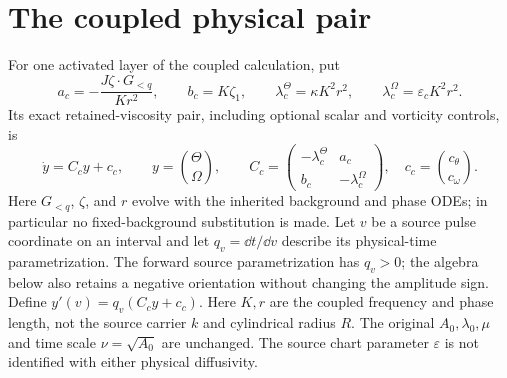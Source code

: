 \section{The coupled physical pair}
For one activated layer of the coupled calculation, put
\begin{equation}
 a_c=-\frac{J\zeta\cdot G_{<q}}{Kr^2},\qquad b_c=K\zeta_1,\qquad
 \lambda_c^\Theta=\kappa K^2r^2,\qquad \lambda_c^\Omega=\varepsilon_c K^2r^2.
\end{equation}
Its exact retained-viscosity pair, including optional scalar and vorticity
controls, is
\begin{equation}
 \dot y=C_cy+c_c,\qquad y=\binom{\Theta}{\Omega},\qquad
 C_c=\begin{pmatrix}-\lambda_c^\Theta&a_c\\b_c&-\lambda_c^\Omega\end{pmatrix},\quad
 c_c=\binom{c_\theta}{c_\omega}.
 \label{nsbridge:eq:coupledpair}
\end{equation}
Here $G_{<q}$, $\zeta$, and $r$ evolve with the inherited background and phase
ODEs; in particular no fixed-background substitution is made.  Let $v$ be a
source pulse coordinate on an interval and let $q_v=\dd t/\dd v$ describe
its physical-time parametrization. The forward source parametrization has
$q_v>0$; the algebra below also retains a negative orientation without
changing the amplitude sign. Define $y'(v)=q_v(C_cy+c_c)$.
Here $K,r$ are the coupled frequency and phase length, not the source
carrier $k$ and cylindrical radius $R$. The original $A_0,\lambda_0,\mu$
and time scale $\nu=\sqrt{A_0}$ are unchanged. The source chart parameter
$\varepsilon$ is not identified with either physical diffusivity.

